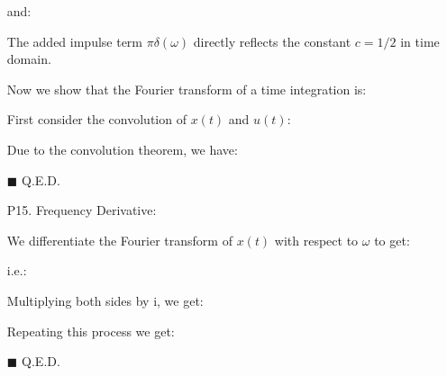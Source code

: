 \begin{itemize}
	and:
	
	The added impulse term $\pi \delta(\omega)$ directly reflects the constant $c=1/2$ in time domain.
	
	Now we show that the Fourier transform of a time integration is:
	
	
	\begin{dem}
	
	First consider the convolution of $x(t)$ and $u(t)$:
	
	Due to the convolution theorem, we have:
	
	\begin{flushright}
		$\blacksquare$  Q.E.D.
	\end{flushright}
	\end{dem}
	
	\item[P15.] Frequency Derivative:
	
	\begin{dem} We differentiate the Fourier transform of $x(t)$ with
	respect to $\omega$ to get:
	
	i.e.:
	
	Multiplying both sides by $\mathrm{i}$, we get:
	
	Repeating this process we get:
	
	\begin{flushright}
		$\blacksquare$  Q.E.D.
	\end{flushright}
	\end{dem}
	
	\end{itemize}
	
